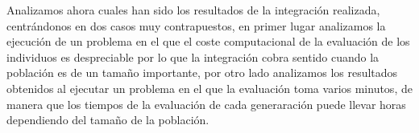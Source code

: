 Analizamos ahora cuales han sido los resultados de la integración realizada, centrándonos en dos casos muy contrapuestos, en primer lugar analizamos la ejecución de un problema en el que el coste computacional de la evaluación de los individuos es despreciable por lo que la integración cobra sentido cuando la población es de un tamaño importante, por otro lado analizamos los resultados obtenidos al ejecutar un problema en el que la evaluación toma varios minutos, de manera que los tiempos de la evaluación de cada generaraci\'on puede llevar horas dependiendo del tamaño de la población.
